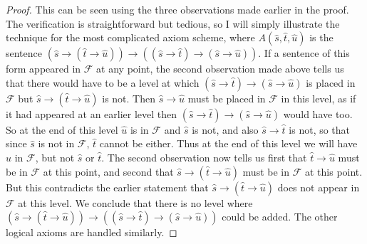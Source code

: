 \documentclass[10pt,a4paper]{amsart}
\begin{document}
\begin{proof}
  This can be seen using the three observations made earlier in the proof. The verification is straightforward but tedious, so I will simply illustrate the technique for the most complicated axiom scheme,
  where $A(\hat{s}, \hat{t}, \hat{u})$ is the sentence $(\hat{s} \to (\hat{t} \to \hat{u})) \to ((\hat{s} \to \hat{t})
  \to (\hat{s} \to \hat{u}))$. If a sentence of this form
  appeared in $\mathcal{F}$ at any point,
  the second observation made above tells us that there would have to be a level at which $(\hat{s} \to \hat{t}) \to
  (\hat{s} \to \hat{u})$ is placed in $\mathcal{F}$ but $\hat{s} \to (\hat{t} \to \hat{u})$ is not. Then
  $\hat{s} \to \hat{u}$ must be placed in $\mathcal{F}$ in this level, as if it had appeared at an earlier level
  then $(\hat{s} \to \hat{t}) \to (\hat{s} \to \hat{u})$ would have too. So at the end of
  this level $\hat{u}$ is in $\mathcal{F}$ and $\hat{s}$ is not, and also $\hat{s} \to \hat{t}$ is not,
  so that since $\hat{s}$ is not in $\mathcal{F}$, $\hat{t}$ cannot be either. Thus at the end of this level we
  will have $\hat{u}$ in $\mathcal{F}$, but not $\hat{s}$ or $\hat{t}$. The second observation now tells us first that
  $\hat{t} \to \hat{u}$ must be in $\mathcal{F}$ at this point, and second that $\hat{s} \to (\hat{t} \to \hat{u})$ must
  be in $\mathcal{F}$ at this point. But this contradicts the earlier statement that
  $\hat{s} \to (\hat{t} \to \hat{u})$ does not appear in $\mathcal{F}$ at this level. We conclude that
  there is no level where $(\hat{s} \to (\hat{t} \to \hat{u})) \to ((\hat{s} \to \hat{t})
  \to (\hat{s} \to \hat{u}))$ could be added. The other logical axioms are handled similarly.
\end{proof}
\end{document}
